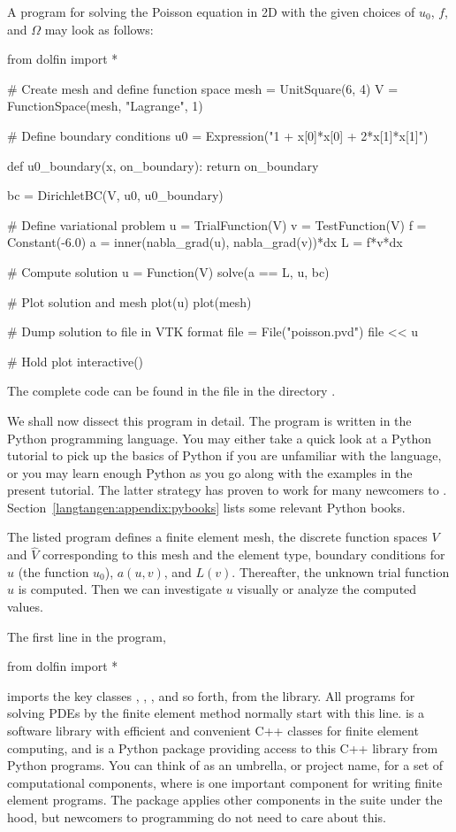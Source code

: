A \fenics{} program for solving the Poisson equation in 2D
with the given choices
of $u_0$, $f$, and $\Omega$ may look as follows:
\begin{python}
from dolfin import *

# Create mesh and define function space
mesh = UnitSquare(6, 4)
V = FunctionSpace(mesh, "Lagrange", 1)

# Define boundary conditions
u0 = Expression("1 + x[0]*x[0] + 2*x[1]*x[1]")

def u0_boundary(x, on_boundary):
    return on_boundary

bc = DirichletBC(V, u0, u0_boundary)

# Define variational problem
u = TrialFunction(V)
v = TestFunction(V)
f = Constant(-6.0)
a = inner(nabla_grad(u), nabla_grad(v))*dx
L = f*v*dx

# Compute solution
u = Function(V)
solve(a == L, u, bc)

# Plot solution and mesh
plot(u)
plot(mesh)

# Dump solution to file in VTK format
file = File("poisson.pvd")
file << u

# Hold plot
interactive()
\end{python}
The complete code can be found in the file  in the
directory .

We shall now dissect this \fenics{} program in detail. The program
is written in the Python programming language.  You may either take a
quick look at a Python tutorial \citep{PythonTutorial} to pick up the
basics of Python if you are unfamiliar with the language, or you may
learn enough Python as you go along with the examples in the present
tutorial. The latter strategy has proven to work for many newcomers
to \fenics.
Section~\ref{langtangen:appendix:pybooks} lists some relevant Python
books.

The listed \fenics{} program defines a finite element mesh, the discrete
function spaces $V$ and $\hat{V}$ corresponding to this mesh and the
element type, boundary conditions for $u$ (the function $u_0$), $a(u,v)$,
and $L(v)$.  Thereafter, the unknown trial function $u$ is computed. Then
we can investigate $u$ visually or analyze the computed values.

The first line in the program,
\begin{python}
from dolfin import *
\end{python}
imports the key classes , ,
, and so forth, from the \dolfin{} library.  All \fenics{}
programs for solving PDEs by the finite element method normally start with
this line. \dolfin{} is a software library with efficient and convenient
C++ classes for finite element computing, and  is a Python
package providing access to this C++ library from Python programs.
You can think of \fenics{} as an umbrella, or project name, for a set
of computational components, where \dolfin{} is one important component for
writing finite element programs. The  package
applies other components in the
\fenics{} suite under the hood, but newcomers to \fenics{} programming
do not need to care about this.

